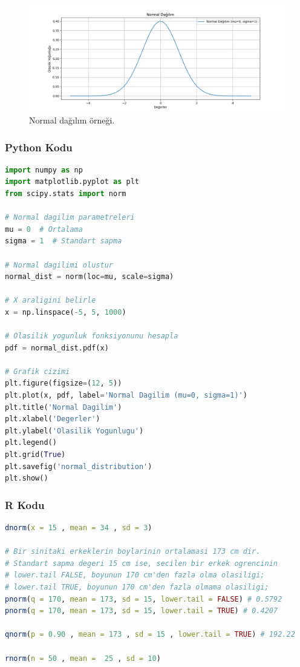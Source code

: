 \begin{figure}[h]
    \centering
    \includegraphics[width=1\textwidth]{images/normal_distribution.png}
    \caption{Normal dağılım örneği.}
    \label{fig:enter-label}
\end{figure}

\subsubsection{Python Kodu}

\begin{lstlisting}[language=Python]
import numpy as np
import matplotlib.pyplot as plt
from scipy.stats import norm

# Normal dagilim parametreleri
mu = 0  # Ortalama
sigma = 1  # Standart sapma

# Normal dagilimi olustur
normal_dist = norm(loc=mu, scale=sigma)

# X araligini belirle
x = np.linspace(-5, 5, 1000)

# Olasilik yogunluk fonksiyonunu hesapla
pdf = normal_dist.pdf(x)

# Grafik cizimi
plt.figure(figsize=(12, 5))
plt.plot(x, pdf, label='Normal Dagilim (mu=0, sigma=1)')
plt.title('Normal Dagilim')
plt.xlabel('Degerler')
plt.ylabel('Olasilik Yogunlugu')
plt.legend()
plt.grid(True)
plt.savefig('normal_distribution')
plt.show()
\end{lstlisting}

\subsubsection{R Kodu}

\begin{lstlisting}[language=R]
dnorm(x = 15 , mean = 34 , sd = 3)

# Bir sinitaki erkeklerin boylarinin ortalamasi 173 cm dir.
# Standart sapma degeri 15 cm ise, secilen bir erkek ogrencinin
# lower.tail FALSE, boyunun 170 cm'den fazla olma olasiligi;
# lower.tail TRUE, boyunun 170 cm'den fazla olmama olasiligi;
pnorm(q = 170, mean = 173, sd = 15, lower.tail = FALSE) # 0.5792
pnorm(q = 170, mean = 173, sd = 15, lower.tail = TRUE) # 0.4207

qnorm(p = 0.90 , mean = 173 , sd = 15 , lower.tail = TRUE) # 192.22

rnorm(n = 50 , mean =  25 , sd = 10)
\end{lstlisting}

